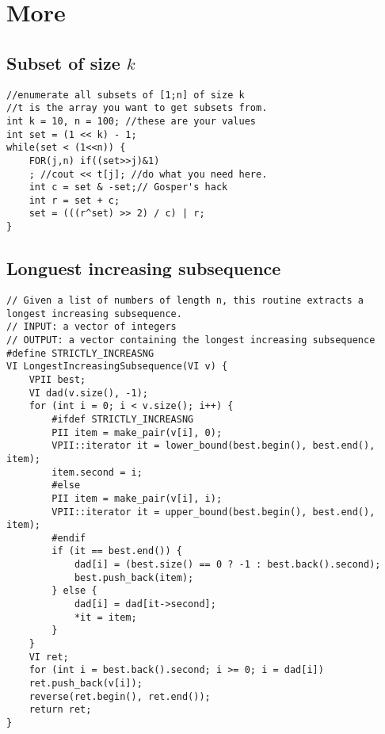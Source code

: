 \documentclass[a4paper,9pt]{article}
\begin{document}
\section{More}

\subsection{Subset of size $k$}

\begin{lstlisting}
//enumerate all subsets of [1;n] of size k
//t is the array you want to get subsets from.
int k = 10, n = 100; //these are your values
int set = (1 << k) - 1;
while(set < (1<<n)) {
	FOR(j,n) if((set>>j)&1)
	; //cout << t[j]; //do what you need here.
	int c = set & -set;// Gosper's hack
	int r = set + c;
	set = (((r^set) >> 2) / c) | r;
}
\end{lstlisting}

\subsection{Longuest increasing subsequence}

\begin{lstlisting}
// Given a list of numbers of length n, this routine extracts a longest increasing subsequence.
// INPUT: a vector of integers
// OUTPUT: a vector containing the longest increasing subsequence
#define STRICTLY_INCREASNG
VI LongestIncreasingSubsequence(VI v) {
	VPII best;
	VI dad(v.size(), -1);
	for (int i = 0; i < v.size(); i++) {
		#ifdef STRICTLY_INCREASNG
		PII item = make_pair(v[i], 0);
		VPII::iterator it = lower_bound(best.begin(), best.end(), item);
		item.second = i;
		#else
		PII item = make_pair(v[i], i);
		VPII::iterator it = upper_bound(best.begin(), best.end(), item);
		#endif
		if (it == best.end()) {
			dad[i] = (best.size() == 0 ? -1 : best.back().second);
			best.push_back(item);
		} else {
			dad[i] = dad[it->second];
			*it = item;
		}
	}
	VI ret;
	for (int i = best.back().second; i >= 0; i = dad[i])
	ret.push_back(v[i]);
	reverse(ret.begin(), ret.end());
	return ret;
}
\end{lstlisting}
\end{document}
